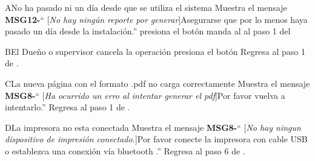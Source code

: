 \begin{UCtrayectoriaA}{A}{No ha pasado ni un día desde que se utiliza el sistema}
			\UCpaso Muestra el mensaje {\bf MSG12-}`` [{\em No hay ningún reporte por generar}]Asegurarse que por lo menos haya pasado un día desde la instalación.''
			\UCpaso [\UCactor] presiona el botón 
			\UCpaso manda al \UCactor al paso 1 del 
		\end{UCtrayectoriaA}	
\begin{UCtrayectoriaA}{B}{El Dueño o supervisor cancela la operación}
			\UCpaso [\UCactor] presiona el botón 
			\UCpaso Regresa al paso 1 de .
		\end{UCtrayectoriaA}
		
\begin{UCtrayectoriaA}{C}{La nueva página con el formato .pdf no carga correctamente}
			\UCpaso Muestra el mensaje {\bf MSG8-}`` [{\em Ha ocurrido un erro al intentar generar el pdf}]Por favor vuelva a intentarlo.''
			\UCpaso Regresa al paso 1 de .
		\end{UCtrayectoriaA}							
\begin{UCtrayectoriaA}{D}{La impresora no esta conectada}
			\UCpaso Muestra el mensaje {\bf MSG8-}`` [{\em No hay ningun dispositivo de impresión conectado.}]Por favor conecte la impresora con cable USB o establezca una conexión vía bluetooth .''
			\UCpaso Regresa al paso 6 de .
		\end{UCtrayectoriaA}			


